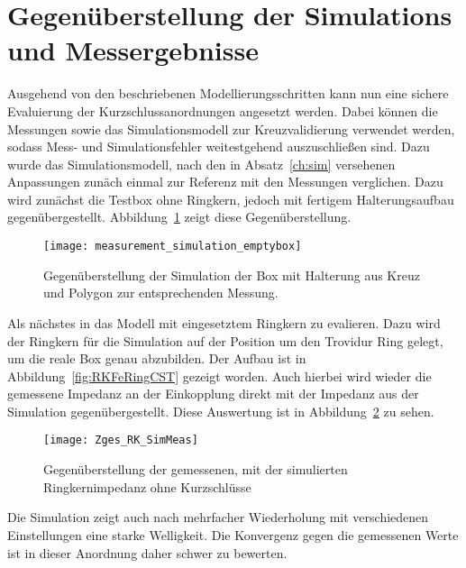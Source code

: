 \section{Gegen\"uberstellung der Simulations und Messergebnisse}
Ausgehend von den beschriebenen Modellierungsschritten kann nun eine sichere Evaluierung der Kurzschlussanordnungen angesetzt werden. Dabei k\"onnen die Messungen sowie das Simulationsmodell zur Kreuzvalidierung verwendet werden, sodass Mess- und Simulationsfehler weitestgehend auszuschlie\ss{}en sind. Dazu wurde das Simulationsmodell, nach den in Absatz~\ref{ch:sim} versehenen Anpassungen zun\"ach einmal zur Referenz mit den Messungen verglichen. Dazu wird zun\"achst die Testbox ohne Ringkern, jedoch mit fertigem Halterungsaufbau gegen\"ubergestellt. Abbildung~\ref{fig:boxpolycross} zeigt diese Gegen\"uberstellung.
\begin{figure}[htb]
	\centering
	\texttt{[image: measurement\_simulation\_emptybox]}
	\caption{Gegen\"uberstellung der Simulation der Box mit Halterung aus Kreuz und Polygon zur entsprechenden Messung.}
	\label{fig:boxpolycross}
\end{figure}
\par
Als n\"achstes in das Modell mit eingesetztem Ringkern zu evalieren. Dazu wird der Ringkern f\"ur die Simulation auf der Position um den Trovidur Ring gelegt, um die reale Box genau abzubilden. Der Aufbau ist in Abbildung~\ref{fig:RKFeRingCST} gezeigt worden. Auch hierbei wird wieder die gemessene Impedanz an der Einkopplung direkt mit der Impedanz aus der Simulation gegen\"ubergestellt. Diese Auswertung ist in Abbildung~\ref{fig:boxpolycrossrk} zu sehen.



\newpage



\begin{figure}[htb]
	\centering
	\texttt{[image: Zges\_RK\_SimMeas]}
	\caption{Gegen\"uberstellung der gemessenen, mit der simulierten Ringkernimpedanz ohne Kurzschl\"usse}
	\label{fig:boxpolycrossrk}
\end{figure}
\par
Die Simulation zeigt auch nach mehrfacher Wiederholung mit verschiedenen Einstellungen eine starke Welligkeit. Die Konvergenz gegen die gemessenen Werte ist in dieser Anordnung daher schwer zu bewerten. 

